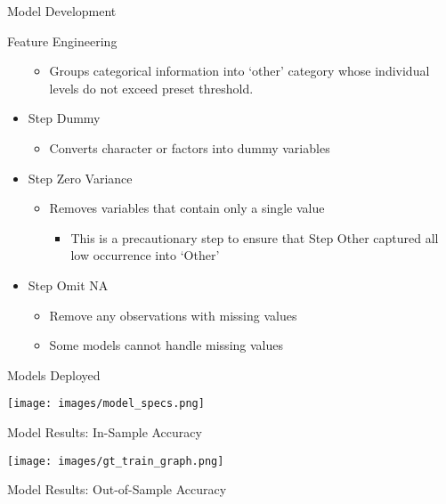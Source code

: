 \documentclass[
  ignorenonframetext,
]{beamer}
\providecommand{\tightlist}{%
  \setlength{\itemsep}{0pt}\setlength{\parskip}{0pt}}
\begin{document}
\begin{frame}{Model Development}
\begin{block}{Feature Engineering}
\begin{itemize}
  \begin{itemize}
  \tightlist
  \item
    Groups categorical information into `other' category whose
    individual levels do not exceed preset threshold.
  \end{itemize}
\item
  Step Dummy

  \begin{itemize}
  \tightlist
  \item
    Converts character or factors into dummy variables
  \end{itemize}
\item
  Step Zero Variance

  \begin{itemize}
  \tightlist
  \item
    Removes variables that contain only a single value

    \begin{itemize}
    \tightlist
    \item
      This is a precautionary step to ensure that Step Other captured
      all low occurrence into `Other'
    \end{itemize}
  \end{itemize}
\item
  Step Omit NA

  \begin{itemize}
  \tightlist
  \item
    Remove any observations with missing values
  \item
    Some models cannot handle missing values
  \end{itemize}
\end{itemize}

\end{block}

\begin{block}{Models Deployed}

\texttt{[image: images/model\_specs.png]}

\end{block}

\begin{block}{Model Results: In-Sample Accuracy}

\texttt{[image: images/gt\_train\_graph.png]}

\end{block}

\begin{block}{Model Results: Out-of-Sample Accuracy}


\end{block}
\end{frame}
\end{document}
